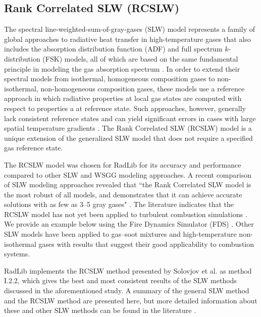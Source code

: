 \documentclass[preprint,12pt]{elsarticle}
\begin{document}

    \subsection{Rank Correlated SLW (RCSLW)} \label{s:RCSLW}

    The spectral line-weighted-sum-of-gray-gases (SLW) model represents a family of global approaches to radiative heat transfer in high-temperature gases that also includes the absorption distribution function (ADF) and full spectrum $k$-distribution (FSK) models, all of which are based on the same fundamental principle in modeling the gas absorption spectrum \cite{Solovjov_2016}. In order to extend their spectral models from isothermal, homogeneous composition gases to non-isothermal, non-homogeneous composition gases, these models use a reference approach in which radiative properties at local gas states are computed with respect to properties a at reference state. Such approaches, however, generally lack consistent reference states and can yield significant errors in cases with large spatial temperature gradients \cite{Solovjov_2017}. The Rank Correlated SLW (RCSLW) model is a unique extension of the generalized SLW model that does not require a specified gas reference state.

    The RCSLW model was chosen for RadLib for its accuracy and performance compared to other SLW and WSGG modeling approaches. A recent comparison of SLW modeling approaches revealed that ``the Rank Correlated SLW model is the most robust of all models, and demonstrates that it can achieve accurate solutions with as few as 3–5 gray gases" \citep{Badger_2019}. The literature indicates that the RCSLW model has not yet been applied to turbulent combustion simulations \cite{Modest_2016,Coelho_2017}. We provide an example below using the Fire Dynamics Simulator (FDS) \cite{FDS}.
    Other SLW models have been applied to gas--soot mixtures \cite{Solovjov_2001,Solovjov_2001b} and high-temperature non-isothermal gases \cite{Solovjov_2011,Solovjov_2020} with results that suggest their good applicability to combustion systems.

    RadLib implements the RCSLW method presented by Solovjov et al. \cite{Solovjov_2017} as method I.2.2, which gives the best and most consistent results of the SLW methods discussed in the aforementioned study. A summary of the general SLW method and the RCSLW method are presented here, but more detailed information about these and other SLW methods can be found in the literature \cite{Solovjov_2000, Solovjov_2001, Solovjov_2008, Solovjov_2011, Solovjov_2014, Solovjov_2016, Solovjov_2017, Webb_2018}.
\end{document}
